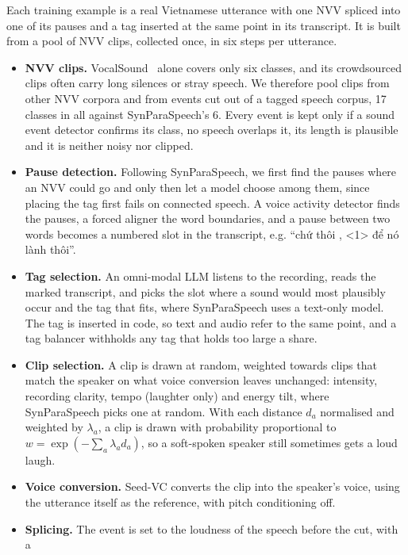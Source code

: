 \documentclass[a4paper]{article}
\makeatletter
\renewcommand{\normalsize}{\fontsize{13.5pt}{15.5pt}\selectfont}
\renewcommand{\subsection}{\@startsection{subsection}{2}{0pt}{5pt}{3pt}{\normalfont\normalsize\bfseries}}
\makeatother
\begin{document}
\subsection{Training-data synthesis}\label{sec:data}
Each training example is a real Vietnamese utterance with one NVV spliced into one of its pauses
and a tag inserted at the same point in its transcript. It is built from a pool of NVV clips,
collected once, in six steps per utterance.
\begin{itemize}
\item \textbf{NVV clips.} VocalSound~\citep{vocalsound} alone covers only six classes, and its
  crowdsourced clips often carry long silences or stray speech. We therefore pool clips from
  other NVV corpora and from events cut out of a tagged speech corpus, 17 classes in all
  against SynParaSpeech's 6. Every event is kept only if a sound event detector confirms its
  class, no speech overlaps it, its length is plausible and it is neither noisy nor clipped.
\item \textbf{Pause detection.} Following SynParaSpeech, we first find the pauses where an NVV
  could go and only then let a model choose among them, since placing the tag first fails on
  connected speech. A voice activity detector finds the pauses, a forced aligner the word
  boundaries, and a pause between two words becomes a numbered slot in the transcript, e.g.
  ``chứ thôi , <1> để nó lành thôi''.
\item \textbf{Tag selection.} An omni-modal LLM listens to the recording, reads the marked
  transcript, and picks the slot where a sound would most plausibly occur and the tag that fits,
  where SynParaSpeech uses a text-only model. The tag is inserted in code, so text and audio
  refer to the same point, and a tag balancer withholds any tag that holds too large a share.
\item \textbf{Clip selection.} A clip is drawn at random, weighted towards clips that match the
  speaker on what voice conversion leaves unchanged: intensity, recording clarity, tempo
  (laughter only) and energy tilt, where SynParaSpeech picks one at random. With each distance
  $d_a$ normalised and weighted by $\lambda_a$, a clip is drawn with probability proportional to
  $w = \exp(-\sum_a \lambda_a d_a)$, so a soft-spoken speaker still sometimes gets a loud laugh.
\item \textbf{Voice conversion.} Seed-VC converts the clip into the speaker's voice, using the
  utterance itself as the reference, with pitch conditioning off.
\item \textbf{Splicing.} The event is set to the loudness of the speech before the cut, with a

\end{itemize}
\end{document}
